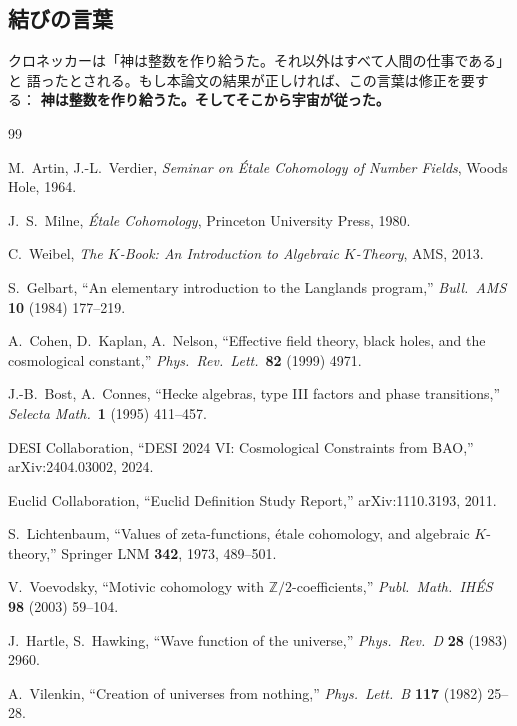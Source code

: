 \documentclass[12pt,a4paper]{article}
\theoremstyle{definition}
\newcommand{\Z}{\mathbb{Z}}
\begin{document}
\subsection{結びの言葉}

クロネッカーは「神は整数を作り給うた。それ以外はすべて人間の仕事である」と
語ったとされる。もし本論文の結果が正しければ、この言葉は修正を要する：
\textbf{神は整数を作り給うた。そしてそこから宇宙が従った。}

\begin{thebibliography}{99}

M.~Artin, J.-L.~Verdier, \textit{Seminar on \'Etale Cohomology of Number Fields},
Woods Hole, 1964.

J.~S.~Milne, \textit{\'Etale Cohomology}, Princeton University Press, 1980.

C.~Weibel, \textit{The $K$-Book: An Introduction to Algebraic $K$-Theory},
AMS, 2013.

S.~Gelbart, ``An elementary introduction to the Langlands program,''
\textit{Bull.\ AMS} \textbf{10} (1984) 177--219.

A.~Cohen, D.~Kaplan, A.~Nelson,
``Effective field theory, black holes, and the cosmological constant,''
\textit{Phys.\ Rev.\ Lett.}\ \textbf{82} (1999) 4971.

J.-B.~Bost, A.~Connes,
``Hecke algebras, type III factors and phase transitions,''
\textit{Selecta Math.}\ \textbf{1} (1995) 411--457.

DESI Collaboration, ``DESI 2024 VI: Cosmological Constraints from BAO,''
arXiv:2404.03002, 2024.

Euclid Collaboration, ``Euclid Definition Study Report,''
arXiv:1110.3193, 2011.

S.~Lichtenbaum, ``Values of zeta-functions, \'etale cohomology, and algebraic $K$-theory,''
Springer LNM \textbf{342}, 1973, 489--501.

V.~Voevodsky, ``Motivic cohomology with $\Z/2$-coefficients,''
\textit{Publ.\ Math.\ IH\'ES} \textbf{98} (2003) 59--104.

J.~Hartle, S.~Hawking,
``Wave function of the universe,''
\textit{Phys.\ Rev.\ D} \textbf{28} (1983) 2960.

A.~Vilenkin, ``Creation of universes from nothing,''
\textit{Phys.\ Lett.\ B} \textbf{117} (1982) 25--28.


\end{thebibliography}
\end{document}
